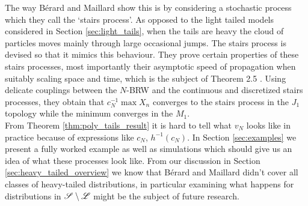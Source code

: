The way Bérard and Maillard show this is by considering a stochastic process which they call the `stairs process'. As opposed to the light tailed models considered in Section \ref{sec:light_tails}, when the tails are heavy the cloud of particles moves mainly through large occasional jumps. The stairs process is devised so that it mimics this behaviour. They prove certain properties of these stairs processes, most importantly their asymptotic speed of propagation when suitably scaling space and time, which is the subject of Theorem 2.5 \cite{poly_tails}. Using delicate couplings between the $N$-BRW and the continuous and discretized stairs processes, they obtain that $c_N^{-1} \max X_n$ converges to the stairs process in the $J_1$ topology while the minimum converges in the $M_1$. \\

From Theorem \ref{thm:poly_tails_result} it is hard to tell what $v_N$ looks like in practice because of expressions like $c_N$, $h^{-1}(c_N)$. In Section \ref{sec:examples} we present a fully worked example as well as simulations which should give us an idea of what these processes look like. From our discussion in Section \ref{sec:heavy_tailed_overview} we know that Bérard and Maillard didn't cover all classes of heavy-tailed distributions, in particular examining what happens for distributions in $\mathscr{S} \setminus \mathscr{L}$ might be the subject of future research.





